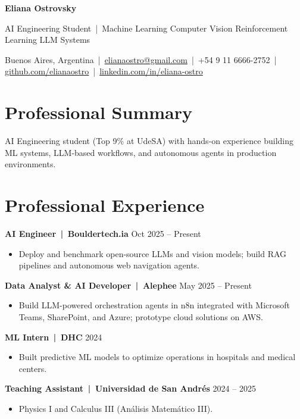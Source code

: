 \documentclass[a4paper,10.5pt]{article}
\begin{document}
{\Large\bfseries Eliana Ostrovsky}\par\smallskip
{\normalsize AI Engineering Student \,|\, Machine Learning \textbullet{} Computer Vision \textbullet{} Reinforcement Learning \textbullet{} LLM Systems}\par
\smallskip
Buenos Aires, Argentina \,|\,
\href{mailto:elianaostro@gmail.com}{elianaostro@gmail.com} \,|\, +54 9 11 6666-2752 \,|\,
\href{https://github.com/elianaostro}{github.com/elianaostro} \,|\, \href{https://linkedin.com/in/eliana-ostro}{linkedin.com/in/eliana-ostro}

\smallskip

\section*{Professional Summary}

AI Engineering student (Top 9\% at UdeSA) with hands-on experience building ML systems, LLM-based workflows, and autonomous agents in production environments.

\section*{Professional Experience}

\textbf{AI Engineer \,|\, Bouldertech.ia} \hfill Oct 2025 -- Present
\begin{itemize}
    \item Deploy and benchmark open-source LLMs and vision models; build RAG pipelines and autonomous web navigation agents.
\end{itemize}

\textbf{Data Analyst \& AI Developer \,|\, Alephee} \hfill May 2025 -- Present
\begin{itemize}
    \item Build LLM-powered orchestration agents in n8n integrated with Microsoft Teams, SharePoint, and Azure; prototype cloud solutions on AWS.
\end{itemize}

\textbf{ML Intern \,|\, DHC} \hfill 2024
\begin{itemize}
    \item Built predictive ML models to optimize operations in hospitals and medical centers.
\end{itemize}

\textbf{Teaching Assistant \,|\, Universidad de San Andrés} \hfill 2024 -- 2025
\begin{itemize}
    \item Physics I and Calculus III (Análisis Matemático III).
\end{itemize}
\end{document}
